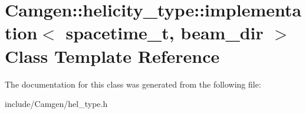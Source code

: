 \hypertarget{a00286}{}\section{Camgen\+:\+:helicity\+\_\+type\+:\+:implementation$<$ spacetime\+\_\+t, beam\+\_\+dir $>$ Class Template Reference}
\label{a00286}


The documentation for this class was generated from the following file\+:\begin{DoxyCompactItemize}
\item 
include/\+Camgen/hel\+\_\+type.\+h\end{DoxyCompactItemize}
